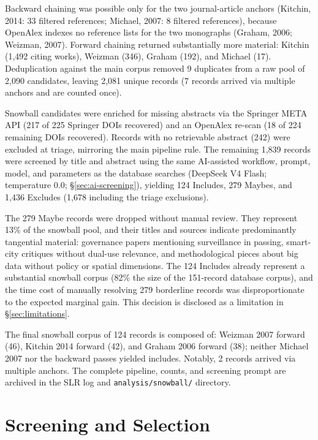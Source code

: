 Backward chaining was possible only for the two journal-article anchors (Kitchin, 2014: 33 filtered references; Michael, 2007: 8 filtered references), because OpenAlex indexes no reference lists for the two monographs (Graham, 2006; Weizman, 2007). Forward chaining returned substantially more material: Kitchin (1,492 citing works), Weizman (346), Graham (192), and Michael (17). Deduplication against the main corpus removed 9 duplicates from a raw pool of 2,090 candidates, leaving 2,081 unique records (7 records arrived via multiple anchors and are counted once).

Snowball candidates were enriched for missing abstracts via the Springer META API (217 of 225 Springer DOIs recovered) and an OpenAlex re-scan (18 of 224 remaining DOIs recovered). Records with no retrievable abstract (242) were excluded at triage, mirroring the main pipeline rule. The remaining 1,839 records were screened by title and abstract using the same AI-assisted workflow, prompt, model, and parameters as the database searches (DeepSeek V4 Flash; temperature 0.0; §\ref{sec:ai-screening}), yielding 124 Includes, 279 Maybes, and 1,436 Excludes (1,678 including the triage exclusions).

The 279 Maybe records were dropped without manual review. They represent 13\% of the snowball pool, and their titles and sources indicate predominantly tangential material: governance papers mentioning surveillance in passing, smart-city critiques without dual-use relevance, and methodological pieces about big data without policy or spatial dimensions. The 124 Includes already represent a substantial snowball corpus (82\% the size of the 151-record database corpus), and the time cost of manually resolving 279 borderline records was disproportionate to the expected marginal gain. This decision is disclosed as a limitation in §\ref{sec:limitations}.

The final snowball corpus of 124 records is composed of: Weizman 2007 forward (46), Kitchin 2014 forward (42), and Graham 2006 forward (38); neither Michael 2007 nor the backward passes yielded includes. Notably, 2 records arrived via multiple anchors. The complete pipeline, counts, and screening prompt are archived in the SLR log and \texttt{analysis/snowball/} directory.

\section{Screening and Selection}
\label{sec:screening}

